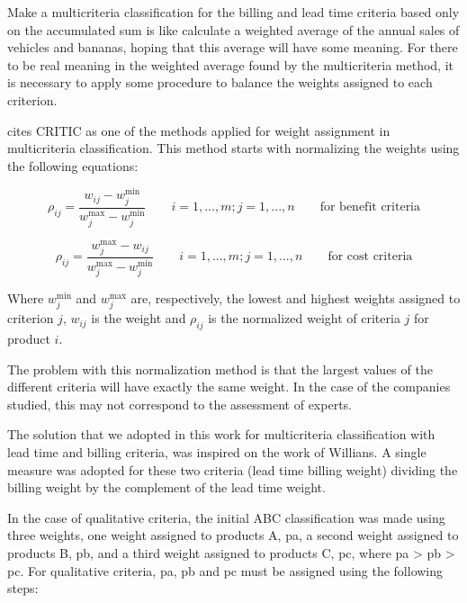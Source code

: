 \documentclass[10pt,fleqn,a4paper,twoside]{article}
\begin{document}
Make a multicriteria classification for the billing and lead time criteria based only on the accumulated sum is like calculate a weighted average of the annual sales of vehicles and bananas, hoping that this average will have some meaning. For there to be real meaning in the weighted average found by the multicriteria method, it is necessary to apply some procedure to balance the weights assigned to each criterion.
	
	\citet{Odu2019} cites CRITIC as one of the methods applied for weight assignment in multicriteria classification. This method starts with normalizing the weights using the following equations:
	
	\begin{equation}
		\rho_{ij} = \frac{w_{ij} - w_{j}^{\min}}{w_{j}^{\max} - w_{j}^{\min}} \qquad i=1,...,m; j = 1, ..., n \qquad \textrm{for benefit criteria}
	\end{equation}
	
	\begin{equation}
		\rho_{ij} = \frac{w_{j}^{\max} - w_{ij}}{w_{j}^{\max} - w_{j}^{\min}} \qquad i=1,...,m; j = 1, ..., n \qquad \textrm{for cost criteria}
	\end{equation}
	
	Where $w_{j}^{\min}$ and $w_{j}^{\max}$ are, respectively, the lowest and highest weights assigned to criterion $j$, $w_{ij}$ is the weight and $\rho_{ij}$ is the normalized weight of criteria $j$ for product $i$. 
	 
	The problem with this normalization method is that the largest values of the different criteria will have exactly the same weight. In the case of the companies studied, this may not correspond to the assessment of experts. 
	
	The solution that we adopted in this work for multicriteria classification with lead time and billing criteria, was inspired on the work of Willians. A single measure was adopted for these two criteria (lead time billing  weight) dividing the billing weight by the complement of the lead time weight.

In the case of qualitative criteria, the initial ABC classification was made using three weights, one weight assigned to products A, pa, a second weight assigned to products B, pb, and a third weight assigned to products C, pc, where pa > pb > pc. For qualitative criteria, pa, pb and pc must be assigned using the following steps:
	
\end{document}
